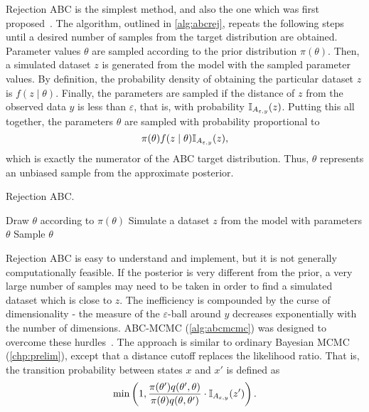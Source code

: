 Rejection ABC is the simplest method, and also the one which was first
proposed~\autocite{rubin1984bayesianly, tavare1997inferring}. The algorithm,
outlined in \cref{alg:abcrej}, repeats the following steps until a desired
number of samples from the target distribution are obtained. Parameter values
$\theta$ are sampled according to the prior distribution $\pi(\theta)$. Then, a
simulated dataset $z$ is generated from the model with the sampled parameter
values. By definition, the probability density of obtaining the particular
dataset $z$ is $f(z \mid \theta)$. Finally, the parameters are sampled if the
distance of $z$ from the observed data $y$ is less than $\varepsilon$, that is,
with probability $\mathbb{I}_{A_{\varepsilon, y}}(z)$. Putting this all together, the
parameters $\theta$ are sampled with probability proportional to
\[
  \pi(\theta) f(z \mid \theta) \mathbb{I}_{A_{\varepsilon, y}}(z),
\]
which is exactly the numerator of the \gls{ABC} target distribution. Thus,
$\theta$ represents an unbiased sample from the approximate posterior.

\begin{algorithm}
  \caption{Rejection \gls{ABC}.}
  \begin{algorithmic}
    \Loop
      \State Draw $\theta$ according to $\pi(\theta)$
      \State Simulate a dataset $z$ from the model with parameters $\theta$
        \State Sample $\theta$
      \EndIf
    \EndLoop
  \end{algorithmic}
  \label{alg:abcrej}
\end{algorithm}

Rejection \gls{ABC} is easy to understand and implement, but it is not
generally computationally feasible. If the posterior is very different from the
prior, a very large number of samples may need to be taken in order to find a
simulated dataset which is close to $z$. The inefficiency is compounded
by the curse of dimensionality - the measure of the $\varepsilon$-ball around
$y$ decreases exponentially with the number of dimensions.
\gls{ABC}-\gls{MCMC} (\cref{alg:abcmcmc}) was designed to overcome these
hurdles~\autocite{marjoram2003markov}. The approach is similar to ordinary
Bayesian \gls{MCMC} (\cref{chp:prelim}), except that a distance cutoff
replaces the likelihood ratio. That is, the transition probability between
states $x$ and $x'$ is defined as
\[
  \min\left(1, \frac{\pi(\theta') q(\theta', \theta)}
                    {\pi(\theta) q(\theta, \theta')} 
    \cdot \mathbb{I}_{A_{\varepsilon, y}}(z') \right).
\]

